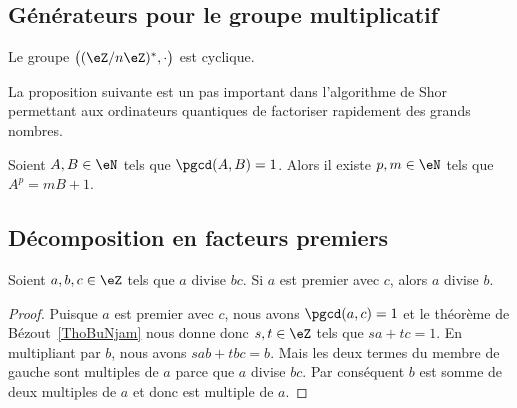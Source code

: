 
\subsection{Générateurs pour le groupe multiplicatif}

\begin{proposition}       \label{PROPooKSCRooPyInSv}
	Le groupe \( \big( (\eZ/n\eZ)^*, \cdot\big)\) est cyclique.
\end{proposition}

La proposition suivante est un pas important dans l'algorithme de Shor permettant aux ordinateurs quantiques de factoriser rapidement des grands nombres.

\begin{proposition}       \label{PROPooZCKXooOtocKE}
	Soient \( A,B\in \eN\) tels que \( \pgcd(A,B)=1\). Alors il existe \( p,m\in \eN\) tels que \( A^p=mB+1\).
\end{proposition}

\subsection{Décomposition en facteurs premiers}

\begin{lemma}    \label{LemPRuUrsD}
	Soient \( a,b,c\in \eZ\) tels que \( a\) divise \( bc\). Si \( a\) est premier avec \( c\), alors \( a\) divise \( b\).
\end{lemma}

\begin{proof}
	Puisque \( a\) est premier avec \( c\), nous avons \( \pgcd(a,c)=1\) et le théorème de Bézout~\ref{ThoBuNjam} nous donne donc \( s,t\in \eZ\) tels que \( sa+tc=1\). En multipliant par \( b\), nous avons \( sab+tbc=b\). Mais les deux termes du membre de gauche sont multiples de \( a\) parce que \( a\) divise \( bc\). Par conséquent \( b\) est somme de deux multiples de \( a\) et donc est multiple de \( a\).
\end{proof}


